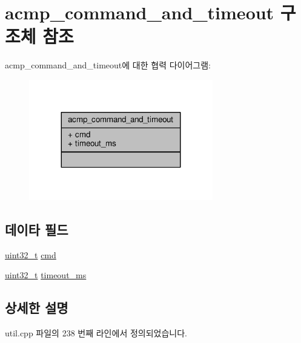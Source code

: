 \hypertarget{structavdecc__lib_1_1utility_1_1acmp__command__and__timeout}{}\section{acmp\+\_\+command\+\_\+and\+\_\+timeout 구조체 참조}
\label{structavdecc__lib_1_1utility_1_1acmp__command__and__timeout}


acmp\+\_\+command\+\_\+and\+\_\+timeout에 대한 협력 다이어그램\+:
\nopagebreak
\begin{figure}[H]
\begin{center}
\leavevmode
\includegraphics[width=227pt]{structavdecc__lib_1_1utility_1_1acmp__command__and__timeout__coll__graph}
\end{center}
\end{figure}
\subsection*{데이타 필드}
\begin{DoxyCompactItemize}
\item 
\hyperlink{parse_8c_a6eb1e68cc391dd753bc8ce896dbb8315}{uint32\+\_\+t} \hyperlink{structavdecc__lib_1_1utility_1_1acmp__command__and__timeout_a5e9712b08d7cbf6091f9e5334ff97b5d}{cmd}
\item 
\hyperlink{parse_8c_a6eb1e68cc391dd753bc8ce896dbb8315}{uint32\+\_\+t} \hyperlink{structavdecc__lib_1_1utility_1_1acmp__command__and__timeout_aca14dfa629015ee4cc42bd01d9933944}{timeout\+\_\+ms}
\end{DoxyCompactItemize}


\subsection{상세한 설명}


util.\+cpp 파일의 238 번째 라인에서 정의되었습니다.



